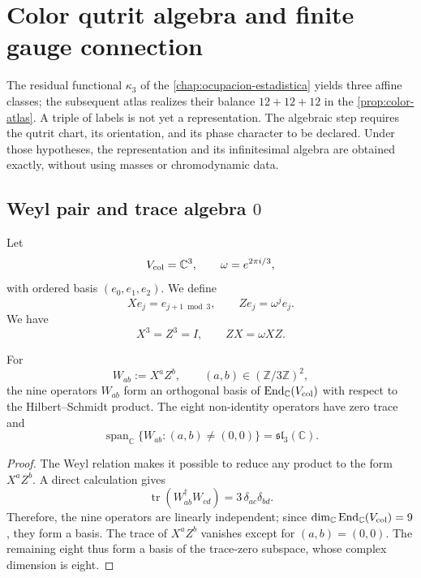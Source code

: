 \chapter{Color qutrit algebra and finite gauge connection}
\label{chap:algebra-color-qutrit}

The residual functional \(\kappa_3\) of the
\cref{chap:ocupacion-estadistica} yields three affine classes; the subsequent
atlas realizes their balance \(12+12+12\) in the
\cref{prop:color-atlas}. A triple of labels is not yet a
representation. The algebraic step requires the qutrit chart, its
orientation, and its phase character to be declared. Under those hypotheses, the representation and
its infinitesimal algebra are obtained exactly, without using masses or
chromodynamic data.

\section{Weyl pair and trace algebra \(0\)}
\label{sec:weyl-color-qutrit}

Let
\[
 V_{\rm col}=\mathbb C^3,
 \qquad
 \omega=e^{2\pi i/3},
\]
with ordered basis \((e_0,e_1,e_2)\). We define
\[
 Xe_j=e_{j+1\bmod3},
 \qquad
 Ze_j=\omega^j e_j.
\]
We have
\[
 X^3=Z^3=I,
 \qquad
 ZX=\omega XZ.
\]

\begin{theorem}
\label{thm:weyl-sl3-color}
For
\[
 W_{ab}:=X^aZ^b,
 \qquad
 (a,b)\in(\mathbb Z/3\mathbb Z)^2,
\]
the nine operators \(W_{ab}\) form an orthogonal basis of
\(\operatorname{End}_{\mathbb C}(V_{\rm col})\) with respect to the
Hilbert--Schmidt product. The eight non-identity operators have zero trace and
\[
 \operatorname{span}_{\mathbb C}
 \{W_{ab}:(a,b)\ne(0,0)\}
 =\mathfrak{sl}_3(\mathbb C).
\]
\end{theorem}

\begin{proof}
The Weyl relation makes it possible to reduce any product to the form
\(X^aZ^b\). A direct calculation gives
\[
 \operatorname{tr}(W_{ab}^{\dagger}W_{cd})
 =3\,\delta_{ac}\delta_{bd}.
\]
Therefore, the nine operators are linearly independent; since
\(\dim_{\mathbb C}\operatorname{End}_{\mathbb C}(V_{\rm col})=9\), they form a
basis. The trace of \(X^aZ^b\) vanishes except for
\((a,b)=(0,0)\). The remaining eight thus form a basis of the trace-zero
subspace, whose complex dimension is eight.
\end{proof}

